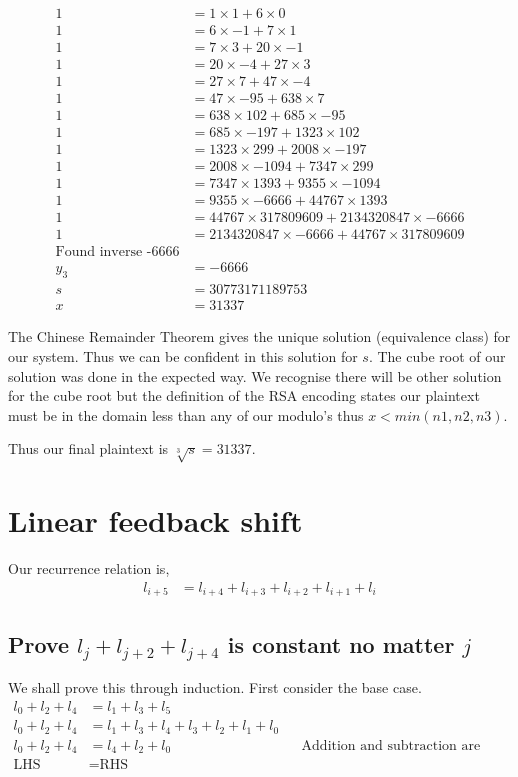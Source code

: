 \documentclass{article}
\begin{document}
\begin{align*}
    1 &= 1 \times 1 + 6 \times 0 \\
    1 &= 6 \times -1 + 7 \times 1 \\
    1 &= 7 \times 3 + 20 \times -1 \\
    1 &= 20 \times -4 + 27 \times 3 \\
    1 &= 27 \times 7 + 47 \times -4 \\
    1 &= 47 \times -95 + 638 \times 7 \\
    1 &= 638 \times 102 + 685 \times -95 \\
    1 &= 685 \times -197 + 1323 \times 102 \\
    1 &= 1323 \times 299 + 2008 \times -197 \\
    1 &= 2008 \times -1094 + 7347 \times 299 \\
    1 &= 7347 \times 1393 + 9355 \times -1094 \\
    1 &= 9355 \times -6666 + 44767 \times 1393 \\
    1 &= 44767 \times 317809609 + 2134320847 \times -6666 \\
    1 &= 2134320847 \times -6666 + 44767 \times 317809609 \\
    \text{Found inverse -6666} \\
    y_3 &= -6666 \\
    s &= 30773171189753 \\
    x &= 31337
\end{align*}

The Chinese Remainder Theorem gives the unique solution (equivalence class)
for our system. Thus we can be confident in this solution for $s$.
The cube root of our solution was done in the expected way.
We recognise there will be other solution for the cube root but the definition
of the RSA encoding states our plaintext must be in the domain less than any
of our modulo's thus $x < min(n1,n2,n3)$.

Thus our final plaintext is $\sqrt[3]{s} = 31337$.

\section{Linear feedback shift}
Our recurrence relation is,
\begin{align*}
    l_{i+5} &= l_{i+4} + l_{i+3} + l_{i+2} + l_{i+1} + l_{i}
\end{align*}

\subsection{Prove $l_j+l_{j+2}+l_{j+4}$ is constant no matter $j$}
We shall prove this through induction. First consider the base case.
\begin{align*}
    l_0 + l_2 + l_4 &= l_1 + l_3 + l_5 \\
    l_0 + l_2 + l_4 &= l_1 + l_3 + l_4 + l_3 + l_2 + l_1 + l_0 \\
    l_0 + l_2 + l_4 &= l_4 + l_2 + l_0
    && \text{Addition and subtraction are equal in binary} \\
    \text{LHS} &= \text{RHS}
\end{align*}
\end{document}
